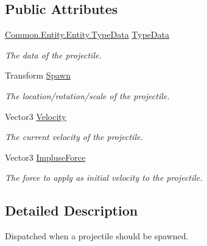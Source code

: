 \subsection*{Public Attributes}
\begin{DoxyCompactItemize}
\item 
\hyperlink{class_skyrates_1_1_common_1_1_entity_1_1_entity_1_1_type_data}{Common.\-Entity.\-Entity.\-Type\-Data} \hyperlink{class_skyrates_1_1_client_1_1_game_1_1_event_1_1_event_spawn_entity_projectile_a016797f925bc681a837055b23ee308f2}{Type\-Data}
\begin{DoxyCompactList}\small\item\em The data of the projectile. \end{DoxyCompactList}\item 
Transform \hyperlink{class_skyrates_1_1_client_1_1_game_1_1_event_1_1_event_spawn_entity_projectile_a9e08d311140edf6156e30bcb65c3d257}{Spawn}
\begin{DoxyCompactList}\small\item\em The location/rotation/scale of the projectile. \end{DoxyCompactList}\item 
Vector3 \hyperlink{class_skyrates_1_1_client_1_1_game_1_1_event_1_1_event_spawn_entity_projectile_a585b4f98f506b65fca022f40d8187c1e}{Velocity}
\begin{DoxyCompactList}\small\item\em The current velocity of the projectile. \end{DoxyCompactList}\item 
Vector3 \hyperlink{class_skyrates_1_1_client_1_1_game_1_1_event_1_1_event_spawn_entity_projectile_ac826f11ddba313002aee37d494f72cf4}{Impluse\-Force}
\begin{DoxyCompactList}\small\item\em The force to apply as initial velocity to the projectile. \end{DoxyCompactList}\end{DoxyCompactItemize}


\subsection{Detailed Description}
Dispatched when a projectile should be spawned. 



